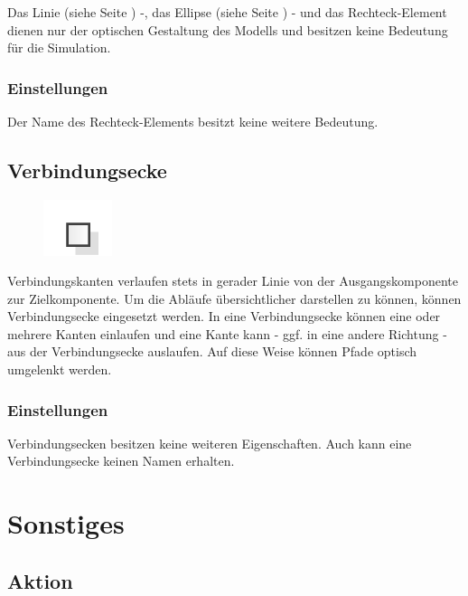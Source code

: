 Das Linie (siehe Seite \pageref{ref:ModelElementLine}) -, das Ellipse (siehe Seite \pageref{ref:ModelElementEllipse}) - und
das Rechteck-Element dienen nur der optischen Gestaltung des Modells und besitzen keine Bedeutung für die Simulation.

\subsection*{Einstellungen}

Der Name des Rechteck-Elements besitzt keine weitere Bedeutung.


\section{Verbindungsecke}
\label{ref:ModelElementVertex}

\begin{figure}
\vspace{-22pt}
\includegraphics[width=2cm]{imageModelElementVertex.png}
\vspace{-22pt}
\end{figure}

Verbindungskanten verlaufen stets in gerader Linie von der Ausgangskomponente zur Zielkomponente.
Um die Abläufe übersichtlicher darstellen zu können, können Verbindungsecke eingesetzt werden. In eine Verbindungsecke können eine
oder mehrere Kanten einlaufen und eine Kante kann - ggf. in eine andere Richtung - aus der Verbindungsecke auslaufen. Auf diese Weise
können Pfade optisch umgelenkt werden.

\subsection*{Einstellungen}

Verbindungsecken besitzen keine weiteren Eigenschaften. Auch kann eine Verbindungsecke keinen Namen erhalten.





\chapter{Sonstiges}

\section{Aktion}
\label{ref:ModelElementAction}

